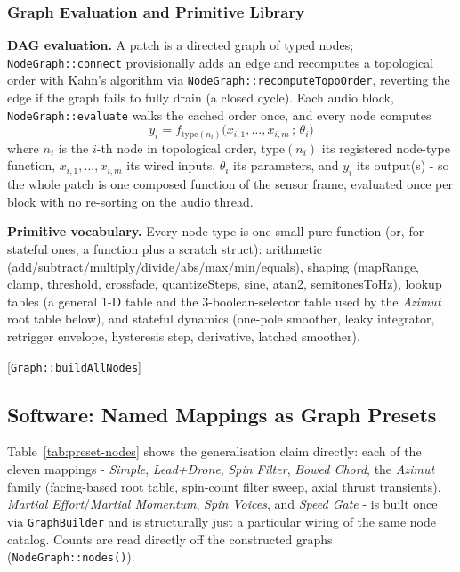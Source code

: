 \documentclass[sigconf,nonacm]{acmart}
\newcommand{\coderef}[1]{{\small [#1]}}
\newcommand{\preset}[1]{\textit{#1}}
\begin{document}
\subsubsection*{Graph Evaluation and Primitive Library}

\textbf{DAG evaluation.} A patch is a directed graph of typed nodes; \texttt{NodeGraph::connect}
provisionally adds an edge and recomputes a topological order with Kahn's algorithm via
\texttt{NodeGraph::recomputeTopoOrder}, reverting the edge if the graph fails to fully drain (a
closed cycle). Each audio block, \texttt{NodeGraph::evaluate} walks the cached order once, and every
node computes
\[
y_i = f_{\text{type}(n_i)}\big(x_{i,1},\dots,x_{i,m}\,;\,\theta_i\big)
\]
where $n_i$ is the $i$-th node in topological order, $\text{type}(n_i)$ its registered node-type
function, $x_{i,1},\dots,x_{i,m}$ its wired inputs, $\theta_i$ its parameters, and $y_i$ its output(s)
- so the whole patch is one composed function of the sensor frame, evaluated once per block with no
re-sorting on the audio thread.

\textbf{Primitive vocabulary.} Every node type is one small pure function (or, for stateful ones, a
function plus a scratch struct): arithmetic (add/subtract/multiply/divide/abs/max/min/equals),
shaping (mapRange, clamp, threshold, crossfade, quantizeSteps, sine, atan2, semitonesToHz), lookup
tables (a general 1-D table and the 3-boolean-selector table used by the \preset{Azimut} root table below),
and stateful dynamics (one-pole smoother, leaky integrator, retrigger envelope, hysteresis step,
derivative, latched smoother).
\begin{flushright}
\coderef{\texttt{Graph::buildAllNodes}}
\end{flushright}

\subsection{Software: Named Mappings as Graph Presets}
\label{sec:named-mappings}
Table~\ref{tab:preset-nodes} shows the generalisation claim directly: each of the eleven mappings - \preset{Simple}, \preset{Lead+Drone},
\preset{Spin Filter}, \preset{Bowed Chord}, the \preset{Azimut} family (facing-based root table, spin-count filter sweep, axial
thrust transients), \preset{Martial Effort}/\preset{Martial Momentum}, \preset{Spin Voices}, and \preset{Speed Gate} - is built once via \texttt{GraphBuilder}
and is structurally just a particular wiring of the same node catalog. Counts are read directly off
the constructed graphs (\texttt{NodeGraph::nodes()}).
\end{document}
